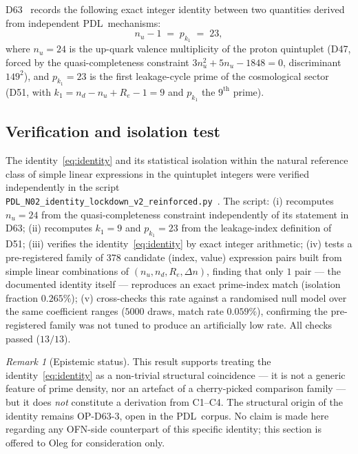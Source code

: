 \documentclass[11pt,a4paper]{article}
\theoremstyle{plain}
\theoremstyle{definition}
\theoremstyle{remark}
\newtheorem{remark}[theorem]{Remark}
\newcommand{\PDL}{\textnormal{PDL}}
\newcommand{\OFN}{\textnormal{OFN}}
\renewcommand{\Re}{R_e}
\newcommand{\nuu}{n_u}
\newcommand{\ndd}{n_d}
\newcommand{\Dn}{\Delta n}
\newcommand{\kone}{k_1}
\newcommand{\pkone}{p_{k_1}}
\begin{document}
D63~\cite{D63} records the following exact integer identity between two quantities derived from independent \PDL\ mechanisms:
\begin{equation}
\nuu - 1 \;=\; \pkone \;=\; 23,
\label{eq:identity}
\end{equation}
where $\nuu = 24$ is the up-quark valence multiplicity of the proton quintuplet (D47, forced by the quasi-completeness constraint $3\nuu^2 + 5\nuu - 1848 = 0$, discriminant $149^2$), and $\pkone = 23$ is the first leakage-cycle prime of the cosmological sector (D51, with $\kone = \ndd - \nuu + \Re - 1 = 9$ and $\pkone$ the $9^{\mathrm{th}}$ prime).

\subsection{Verification and isolation test}

The identity~\eqref{eq:identity} and its statistical isolation within the natural reference class of simple linear expressions in the quintuplet integers were verified independently in the script \\ \texttt{PDL\_N02\_identity\_lockdown\_v2\_reinforced.py}~\cite{PDLN02lockdown}. The script: (i) recomputes $\nuu = 24$ from the quasi-completeness constraint independently of its statement in D63; (ii) recomputes $\kone = 9$ and $\pkone = 23$ from the leakage-index definition of D51; (iii) verifies the identity~\eqref{eq:identity} by exact integer arithmetic; (iv) tests a pre-registered family of 378 candidate (index, value) expression pairs built from simple linear combinations of $(\nuu, \ndd, \Re, \Dn)$, finding that only $1$ pair --- the documented identity itself --- reproduces an exact prime-index match (isolation fraction $0.265\%$); (v) cross-checks this rate against a randomised null model over the same coefficient ranges ($5000$ draws, match rate $0.059\%$), confirming the pre-registered family was not tuned to produce an artificially low rate. All checks passed ($13/13$).

\begin{remark}[Epistemic status]
This result supports treating the identity~\eqref{eq:identity} as a non-trivial structural coincidence --- it is not a generic feature of prime density, nor an artefact of a cherry-picked comparison family --- but it does \emph{not} constitute a derivation from C1--C4. The structural origin of the identity remains OP-D63-3, open in the \PDL\ corpus. No claim is made here regarding any \OFN-side counterpart of this specific identity; this section is offered to Oleg for consideration only.
\end{remark}
\end{document}
